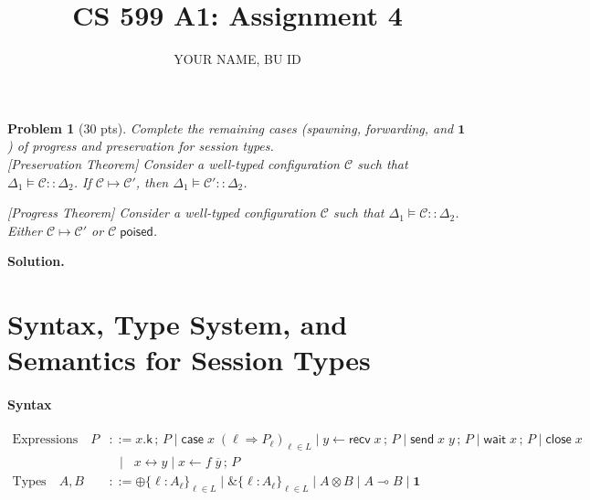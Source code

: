 \documentclass{article}
\title{CS 599 A1: Assignment 4}
\author{YOUR NAME, BU ID}
\date{}
\newcommand{\m}[1]{\mathsf{#1}}
\newcommand{\step}{\mapsto}
\newcommand{\semi}{\,;\,}
\newcommand{\ecase}[3]{\m{case} \; #1 \; (#2 \Rightarrow #3)}
\newcommand{\erecv}[2]{#2 \leftarrow \m{recv} \; #1}
\newcommand{\esend}[2]{\m{send} \; #1 \; #2}
\newcommand{\ewait}[1]{\m{wait} \; #1}
\newcommand{\eclose}[1]{\m{close} \; #1}
\newcommand{\fwd}[2]{#1 \leftrightarrow #2}
\newcommand{\espawn}[3]{#1 \leftarrow #2 \; #3}
\newcommand{\ichoice}[1]{\oplus\{#1\}}
\newcommand{\echoice}[1]{\&\{#1\}}
\newcommand{\one}{\mathbf{1}}
\newcommand{\config}{\mathcal{C}}
\newcommand{\D}{\Delta}
\newcommand{\poised}[1]{#1 \; \m{poised}}
\newtheorem{problem}{Problem}
\newenvironment{solution}{\textbf{Solution.}}{}
\begin{document}
\maketitle


\begin{problem}[30 pts]
  Complete the remaining cases (spawning, forwarding, and $\one$) of progress and preservation for session types.\\

  [Preservation Theorem] Consider a well-typed configuration $\config$ such that $\D_1 \vDash \config :: \D_2$.
  If $\config \step \config'$, then $\D_1 \vDash \config' :: \D_2$.

  [Progress Theorem] Consider a well-typed configuration $\config$ such that $\D_1 \vDash \config :: \D_2$.
  Either $\config \step \config'$ or $\poised{\config}$.
\end{problem}

\begin{solution}
  
\end{solution}

\appendix

\section{Syntax, Type System, and Semantics for Session Types}\label{app:st}

\paragraph*{Syntax}
\begin{align*}
  \text{Expressions} \quad P & ::= x.\m{k} \semi P \mid \ecase{x}{\ell}{P_{\ell}}_{\ell \in L} \mid \erecv{x}{y} \semi P \mid \esend{x}{y} \semi P \mid \ewait{x} \semi P \mid \eclose{x} \\
  & \;\; \mid \;\; \fwd{x}{y} \mid \espawn{x}{f}{\overline{y}} \semi P \\
  \text{Types} \quad A, B & ::= \ichoice{\ell : A_{\ell}}_{\ell \in L} \mid \echoice{\ell : A_{\ell}}_{\ell \in L} \mid
  A \otimes B \mid A \multimap B \mid \one
\end{align*}
\end{document}

